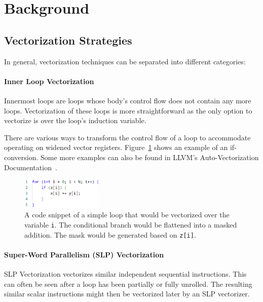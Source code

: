 \documentclass[sigplan,11pt,nonacm]{acmart}
\begin{document}


\section{Background}
\label{sec:background}

\subsection{Vectorization Strategies}
\label{back:vec-strat}
In general, vectorization techniques can be separated into different categories:

\paragraph{Inner Loop Vectorization}
Innermost loops are loops whose body's control flow does not contain any more loops.
Vectorization of these loops is more straightforward as the only option to vectorize is over 
the loop's induction variable.

There are various ways to transform the control flow of a loop to accommodate operating on widened
vector registers. Figure~\ref{fig:inner-loop-vec} shows an example of an if-conversion. Some more
examples can also be found in LLVM's Auto-Vectorization Documentation~\cite{llvmvec}.

\begin{figure}
  \centering
  \includegraphics[width=0.35\textwidth]{images/inner-loop-vec.png}
  \caption{A code snippet of a simple loop that would be vectorized over the variable \texttt{i}. 
  The conditional branch would be flattened into a masked addition. The mask would be generated 
  based on \texttt{z[i]}.}
  \label{fig:inner-loop-vec}
\end{figure}

\paragraph{Super-Word Parallelism (SLP) Vectorization}
SLP Vectorization vectorizes similar independent sequential instructions. This can often be seen 
after a loop has been partially or fully unrolled. The resulting similar scalar 
instructions might then be vectorized later by an SLP vectorizer.
\end{document}
